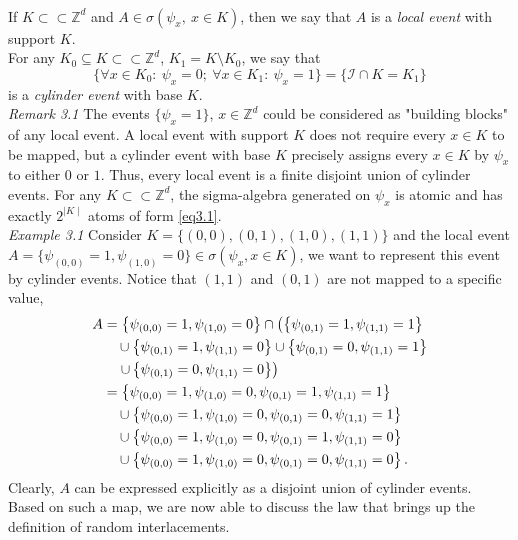 \documentclass[
11pt, %
a4paper, %
oneside, %
headinclude,footinclude, %
BCOR5mm, %
]{scrartcl}
\begin{document}
\\If $K \subset\subset \mathbb{Z}^d$ and $A \in \sigma(\psi_x, \ x \in K)$, then we say that $A$ is a \textit{local event} with support $K$.
\\For any $K_0 \subseteq K \subset\subset \mathbb{Z}^d$, $K_1=K\setminus K_0$, we say that
\begin{equation}
    \label{eq3.1}
    \{\forall x \in K_0: \ \psi_x=0; \ \forall x \in K_1: \ \psi_x=1\}=\{\mathscr{I} \cap K=K_1\} \tag{3.1}
\end{equation}
is a \textit{cylinder event} with base $K$.
\vspace{0.6em}\\\textit{Remark 3.1} The events $\{\psi_x=1\}$, $x \in \mathbb{Z}^d$ could be considered as "building blocks" of any local event. A local event with support $K$ does not require every $x \in K$ to be mapped, but a cylinder event with base $K$ precisely assigns every $x \in K$ by $\psi_x$ to either $0$ or $1$. Thus, every local event is a finite disjoint union of cylinder events. For any $K \subset\subset \mathbb{Z}^d$, the sigma-algebra generated on $\psi_x$ is atomic and has exactly $2^{\mid K \mid}$ atoms of form \eqref{eq3.1}.
\vspace{0.6em}\\\textit{Example 3.1} Consider $K=\{ (0,0), (0,1),  (1,0),  (1,1) \}$ and the local event $A=\{ \psi_{(0,0)}=1, \psi_{(1,0)}=0\} \in \sigma(\psi_x,x \in K)$, we want to represent this event by cylinder events. Notice that $(1,1)$ and $(0,1)$ are not mapped to a specific value,
\begin{align}
A &=\left\{ \psi_{(0,0)}=1, \psi_{(1,0)}=0\right\} \cap \left( \left\{         \psi_{(0,1)}=1, \psi_{(1,1)}=1\right\}\right.\notag \\ 
    &\quad \cup \left\{ \psi_{(0,1)}=1, \psi_{(1,1)}=0\right\} \cup \left\{ \psi_{(0,1)}=0, \psi_{(1,1)}=1\right\} \notag \\
    &\left. \quad \cup \left\{ \psi_{(0,1)}=0, \psi_{(1,1)}=0\right\} \right) \notag \\
    &=\left\{\psi_{(0,0)}=1, \psi_{(1,0)}=0,\psi_{(0,1)}=1, \psi_{(1,1)}=1 \right\} \notag \\
    &\quad \cup \left\{\psi_{(0,0)}=1, \psi_{(1,0)}=0,\psi_{(0,1)}=0, \psi_{(1,1)}=1 \right\}\notag \\
    &\quad  \cup \left\{\psi_{(0,0)}=1, \psi_{(1,0)}=0,\psi_{(0,1)}=1, \psi_{(1,1)}=0 \right\} \notag \\
    &\quad \cup \left\{\psi_{(0,0)}=1, \psi_{(1,0)}=0,\psi_{(0,1)}=0, \psi_{(1,1)}=0 \right\}. \notag 
\end{align}
Clearly, $A$ can be expressed explicitly as a disjoint union of cylinder events. Based on such a map, we are now able to discuss the law that brings up the definition of random interlacements.
\end{document}
